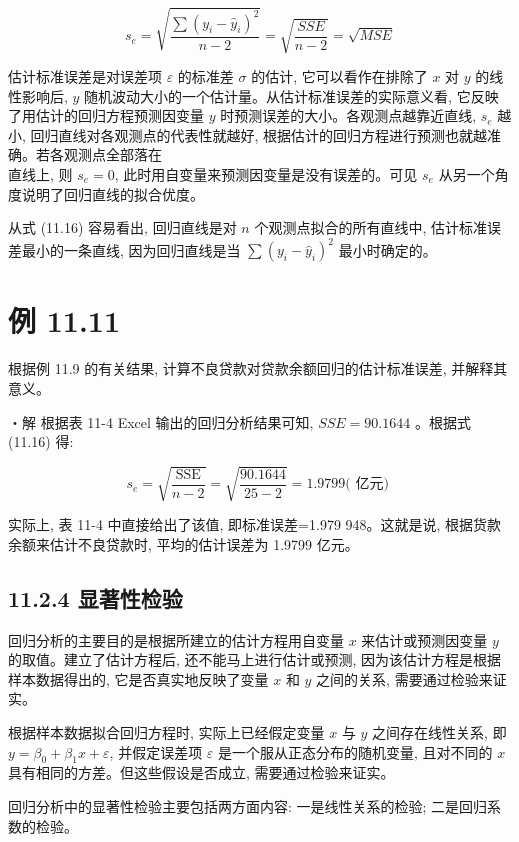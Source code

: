 \documentclass[10pt]{article}
\begin{document}
\begin{CJK*}{UTF8}{bsmi}
\begin{equation*}
s_{e}=\sqrt{\frac{\sum\left(y_{i}-\hat{y}_{i}\right)^{2}}{n-2}}=\sqrt{\frac{S S E}{n-2}}=\sqrt{M S E} \tag{11.16}
\end{equation*}


估计标准误差是对误差项 $\varepsilon$ 的标准差 $\sigma$ 的估计, 它可以看作在排除了 $x$ 对 $y$ 的线性影响后, $y$ 随机波动大小的一个估计量。从估计标准误差的实际意义看, 它反映了用估计的回归方程预测因变量 $y$ 时预测误差的大小。各观测点越靠近直线, $s_{e}$ 越小, 回归直线对各观测点的代表性就越好, 根据估计的回归方程进行预测也就越准确。若各观测点全部落在\\
直线上, 则 $s_{e}=0$, 此时用自变量来预测因变量是没有误差的。可见 $s_{e}$ 从另一个角度说明了回归直线的拟合优度。

从式 (11.16) 容易看出, 回归直线是对 $n$ 个观测点拟合的所有直线中, 估计标准误差最小的一条直线, 因为回归直线是当 $\sum\left(y_{i}-\hat{y}_{i}\right)^{2}$ 最小时确定的。

\section*{例 11.11}
根据例 11.9 的有关结果, 计算不良贷款对贷款余额回归的估计标准误差, 并解释其意义。

・解 根据表 11-4 Excel 输出的回归分析结果可知, $S S E=90.1644$ 。根据式 (11.16) 得:

$$
s_{e}=\sqrt{\frac{\operatorname{SSE}}{n-2}}=\sqrt{\frac{90.1644}{25-2}}=1.9799(\text { 亿元) }
$$

实际上, 表 11-4 中直接给出了该值, 即标准误差=1.979 948。这就是说, 根据货款余额来估计不良贷款时, 平均的估计误差为 1.9799 亿元。

\subsection*{11.2.4 显著性检验}
回归分析的主要目的是根据所建立的估计方程用自变量 $x$ 来估计或预测因变量 $y$ 的取值。建立了估计方程后, 还不能马上进行估计或预测, 因为该估计方程是根据样本数据得出的, 它是否真实地反映了变量 $x$ 和 $y$ 之间的关系, 需要通过检验来证实。

根据样本数据拟合回归方程时, 实际上已经假定变量 $x$ 与 $y$ 之间存在线性关系, 即 $y=\beta_{0}+\beta_{1} x+\varepsilon$, 并假定误差项 $\varepsilon$ 是一个服从正态分布的随机变量, 且对不同的 $x$ 具有相同的方差。但这些假设是否成立, 需要通过检验来证实。

回归分析中的显著性检验主要包括两方面内容: 一是线性关系的检验; 二是回归系数的检验。


\end{CJK*}
\end{document}
